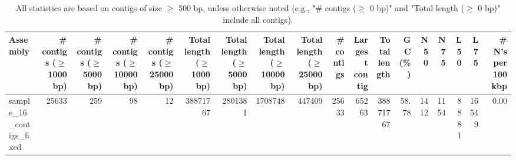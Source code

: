 \documentclass[12pt,a4paper]{article}
\begin{document}
\begin{table}[ht]
\begin{center}
\caption{All statistics are based on contigs of size $\geq$ 500 bp, unless otherwise noted (e.g., "\# contigs ($\geq$ 0 bp)" and "Total length ($\geq$ 0 bp)" include all contigs).}
\begin{tabular}{|l*{17}{|r}|}
\hline
Assembly & \# contigs ($\geq$ 1000 bp) & \# contigs ($\geq$ 5000 bp) & \# contigs ($\geq$ 10000 bp) & \# contigs ($\geq$ 25000 bp) & Total length ($\geq$ 1000 bp) & Total length ($\geq$ 5000 bp) & Total length ($\geq$ 10000 bp) & Total length ($\geq$ 25000 bp) & \# contigs & Largest contig & Total length & GC (\%) & N50 & N75 & L50 & L75 & \# N's per 100 kbp \\ \hline
sample\_16\_contigs\_fixed & 25633 & 259 & 98 & 12 & 38871767 & 2801381 & 1708748 & 447409 & 25633 & 65263 & 38871767 & 58.78 & 1412 & 1154 & 8881 & 16549 & 0.00 \\ \hline
\end{tabular}
\end{center}
\end{table}
\end{document}
